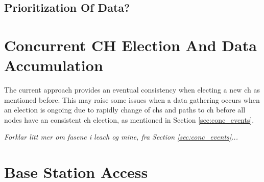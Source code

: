 \documentclass[USenglish]{uit-thesis}
\begin{document}



\subsection{Prioritization Of Data?}

\section{Concurrent CH Election And Data Accumulation} \label{disc:simult_el_acc}
The current approach provides an eventual consistency when electing a new \gls{ch} as mentioned before. This may raise some issues when a data gathering occurs when an election is ongoing due to rapidly change of \gls{ch}s and paths to \gls{ch} before all nodes have an consistent \gls{ch} election, as mentioned in Section \ref{sec:conc_events}.

\textit{Forklar litt mer om fasene i \gls{leach} og mine, fra Section \ref{sec:conc_events}...}



\section{Base Station Access}
\end{document}
